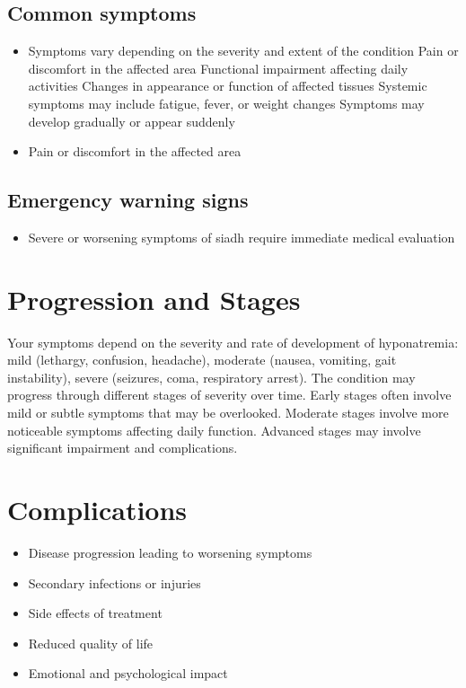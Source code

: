 \subsection{Common symptoms}
\begin{itemize}[noitemsep]
  \item Symptoms vary depending on the severity and extent of the condition Pain or discomfort in the affected area Functional impairment affecting daily activities Changes in appearance or function of affected tissues Systemic symptoms may include fatigue, fever, or weight changes Symptoms may develop gradually or appear suddenly
  \item Pain or discomfort in the affected area
  \end{itemize}

\subsection{Emergency warning signs}
\begin{itemize}[noitemsep]
  \item Severe or worsening symptoms of siadh require immediate medical evaluation
\end{itemize}
\section{Progression and Stages}
Your symptoms depend on the severity and rate of development of hyponatremia: mild (lethargy, confusion, headache), moderate (nausea, vomiting, gait instability), severe (seizures, coma, respiratory arrest). The condition may progress through different stages of severity over time. Early stages often involve mild or subtle symptoms that may be overlooked. Moderate stages involve more noticeable symptoms affecting daily function. Advanced stages may involve significant impairment and complications.
\section{Complications}
\begin{itemize}[noitemsep]
  \item Disease progression leading to worsening symptoms
  \item Secondary infections or injuries
  \item Side effects of treatment
  \item Reduced quality of life
  \item Emotional and psychological impact
\end{itemize}
